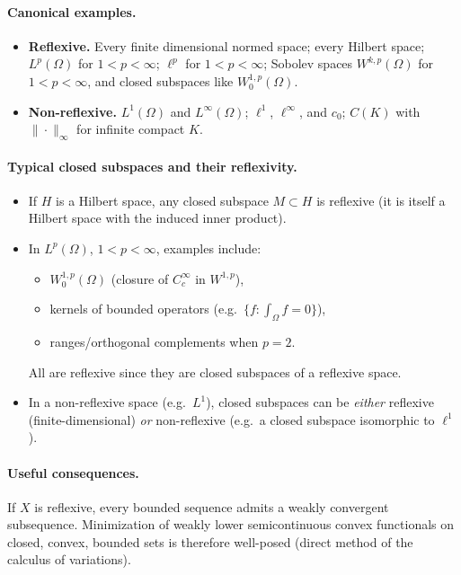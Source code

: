 \documentclass[12pt,a4paper]{article}
\theoremstyle{plain}
\theoremstyle{definition}
\theoremstyle{remark}
\theoremstyle{remark}
\theoremstyle{definition}
\begin{document}
	\paragraph{Canonical examples.}
	\begin{itemize}
		\item \textbf{Reflexive.} Every finite dimensional normed space; every Hilbert space;
		$L^{p}(\Omega)$ for $1<p<\infty$; $\ell^{p}$ for $1<p<\infty$; Sobolev spaces
		$W^{k,p}(\Omega)$ for $1<p<\infty$, and closed subspaces like $W^{1,p}_0(\Omega)$.
		\item \textbf{Non-reflexive.} $L^{1}(\Omega)$ and $L^{\infty}(\Omega)$;
		$\ell^{1}$, $\ell^{\infty}$, and $c_{0}$; $C(K)$ with $\|\cdot\|_\infty$ for infinite compact $K$.
	\end{itemize}
	
	\paragraph{Typical closed subspaces and their reflexivity.}
	\begin{itemize}
		\item If $H$ is a Hilbert space, any closed subspace $M\subset H$ is reflexive
		(it is itself a Hilbert space with the induced inner product).
		\item In $L^{p}(\Omega)$, $1<p<\infty$, examples include:
		\begin{itemize}
			\item $W^{1,p}_0(\Omega)$ (closure of $C_c^\infty$ in $W^{1,p}$),
			\item kernels of bounded operators (e.g.\ $\{f:\int_\Omega f=0\}$),
			\item ranges/orthogonal complements when $p=2$.
		\end{itemize}
		All are reflexive since they are closed subspaces of a reflexive space.
		\item In a non-reflexive space (e.g.\ $L^{1}$), closed subspaces can be
		\emph{either} reflexive (finite-dimensional) \emph{or} non-reflexive
		(e.g.\ a closed subspace isomorphic to $\ell^{1}$).
	\end{itemize}
	
	\paragraph{Useful consequences.}
	If $X$ is reflexive, every bounded sequence admits a weakly convergent subsequence.
	Minimization of weakly lower semicontinuous convex functionals on closed, convex, bounded sets
	is therefore well-posed (direct method of the calculus of variations).
	
\end{document}
